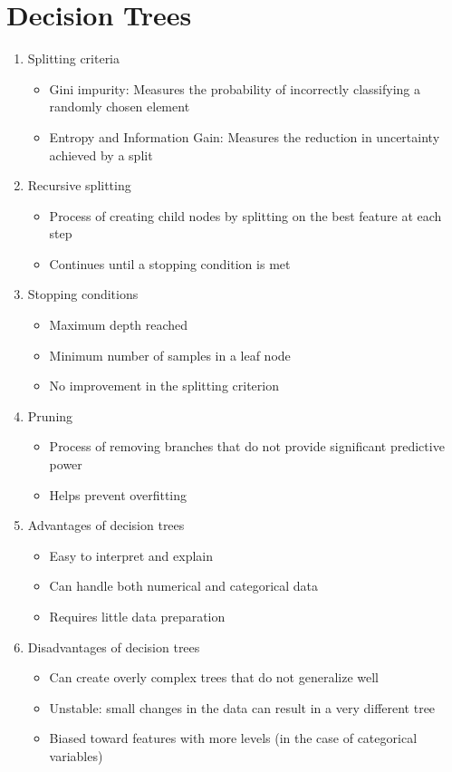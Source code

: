 \documentclass{article}
\begin{document}
\section{Decision Trees}
\begin{enumerate}
    \item Splitting criteria
    \begin{itemize}
        \item Gini impurity: Measures the probability of incorrectly classifying a randomly chosen element
        \item Entropy and Information Gain: Measures the reduction in uncertainty achieved by a split
    \end{itemize}
    
    \item Recursive splitting
    \begin{itemize}
        \item Process of creating child nodes by splitting on the best feature at each step
        \item Continues until a stopping condition is met
    \end{itemize}
    
    \item Stopping conditions
    \begin{itemize}
        \item Maximum depth reached
        \item Minimum number of samples in a leaf node
        \item No improvement in the splitting criterion
    \end{itemize}
    
    \item Pruning
    \begin{itemize}
        \item Process of removing branches that do not provide significant predictive power
        \item Helps prevent overfitting
    \end{itemize}
    
    \item Advantages of decision trees
    \begin{itemize}
        \item Easy to interpret and explain
        \item Can handle both numerical and categorical data
        \item Requires little data preparation
    \end{itemize}
    
    \item Disadvantages of decision trees
    \begin{itemize}
        \item Can create overly complex trees that do not generalize well
        \item Unstable: small changes in the data can result in a very different tree
        \item Biased toward features with more levels (in the case of categorical variables)
    \end{itemize}
\end{enumerate}
\end{document}
